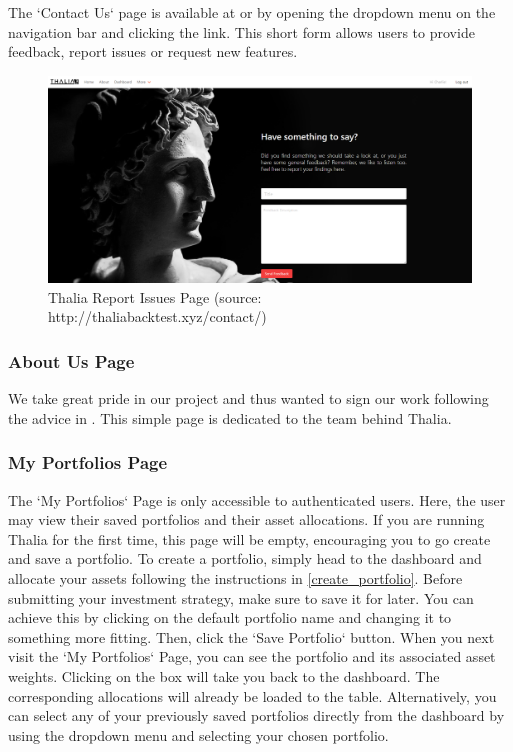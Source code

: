 \documentclass[main.tex]{subfiles}
\begin{document}
The `Contact Us` page is available at  or by opening the dropdown menu on the navigation bar and clicking the link. This short form allows users to provide feedback, report issues or request new features.

\begin{figure}[H]
   \centering
   \includegraphics[width=\textwidth]{08Appendices/081User/081Pictures/issues.png}
   \caption{Thalia Report Issues Page (source: http://thaliabacktest.xyz/contact/)}
   \label{thalia_issues}
\end{figure}

\subsubsection{About Us Page}
We take great pride in our project and thus wanted to sign our work following the advice in \cite{pragmaticprog}. This simple page is dedicated to the team behind Thalia.

\subsubsection{My Portfolios Page}

The `My Portfolios` Page is only accessible to authenticated users. Here, the user may view their saved portfolios and their asset allocations. If you are running Thalia for the first time, this page will be empty, encouraging you to go create and save a portfolio.
To create a portfolio, simply head to the dashboard and allocate your assets following the instructions in \ref{create_portfolio}. Before submitting your investment strategy, make sure to save it for later. You can achieve this by clicking on the default portfolio name and changing it to something more fitting. Then, click the `Save Portfolio` button. When you next visit the `My Portfolios` Page, you can see the portfolio and its associated asset weights. Clicking on the box will take you back to the dashboard. The corresponding allocations will already be loaded to the table. Alternatively, you can select any of your previously saved portfolios directly from the dashboard by using the dropdown menu and selecting your chosen portfolio.
\end{document}

